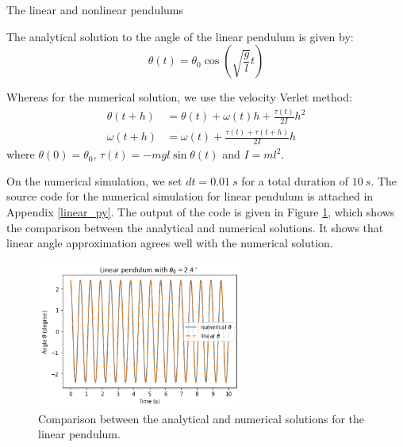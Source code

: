 \documentclass{article}
\begin{document}
\begin{section}{The linear and nonlinear pendulums}
\begin{enumerate}[1.]
\begin{tcolorbox}[breakable]
		The analytical solution to the angle of the linear pendulum is given by:
		\begin{equation}
			\theta(t) = \theta_0 \cos{\left( \sqrt{\frac{g}{l}} t \right)}
		\end{equation}

		Whereas for the numerical solution, we use the velocity Verlet method:
		\begin{align}
			\theta(t+h) & = \theta(t) + \omega(t) h  + \frac{\tau(t)}{2I} h^2 \\
			\omega(t+h) & = \omega(t) + \frac{\tau(t) + \tau(t+h)}{2I} h
		\end{align}
		where $\theta(0) = \theta_0$, $\tau(t) = - m g l \sin{\theta(t)}$ and $I = m l^2$.

		On the numerical simulation, we set $dt = \SI{0.01}{s}$ for a total duration of $\SI{10}{s}$. The source code for the numerical simulation for linear pendulum is attached in Appendix \ref{linear_py}. The output of the code is given in Figure \ref{fig:linear_theta}, which shows the comparison between the analytical and numerical solutions. It shows that linear angle approximation agrees well with the numerical solution.

		\begin{figure}[H]
			\centering
			\includegraphics[width=0.6\textwidth]{images/linear_theta.png}
			\caption{Comparison between the analytical and numerical solutions for the linear pendulum.}
			\label{fig:linear_theta}
		\end{figure}
	\end{tcolorbox}


\end{enumerate}
\end{section}
\end{document}
